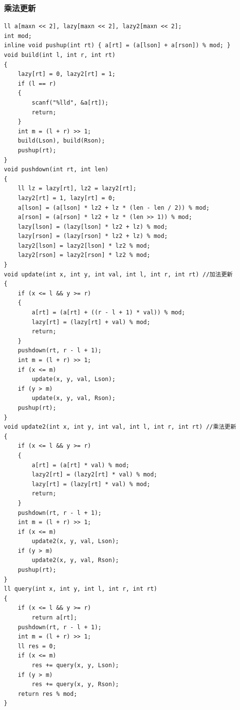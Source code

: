 \documentclass[twoside]{article}
\begin{document}
\subsubsection{乘法更新}
\begin{lstlisting}
ll a[maxn << 2], lazy[maxn << 2], lazy2[maxn << 2];
int mod;
inline void pushup(int rt) { a[rt] = (a[lson] + a[rson]) % mod; }
void build(int l, int r, int rt)
{
    lazy[rt] = 0, lazy2[rt] = 1;
    if (l == r)
    {
        scanf("%lld", &a[rt]);
        return;
    }
    int m = (l + r) >> 1;
    build(Lson), build(Rson);
    pushup(rt);
}
void pushdown(int rt, int len)
{
    ll lz = lazy[rt], lz2 = lazy2[rt];
    lazy2[rt] = 1, lazy[rt] = 0;
    a[lson] = (a[lson] * lz2 + lz * (len - len / 2)) % mod;
    a[rson] = (a[rson] * lz2 + lz * (len >> 1)) % mod;
    lazy[lson] = (lazy[lson] * lz2 + lz) % mod;
    lazy[rson] = (lazy[rson] * lz2 + lz) % mod;
    lazy2[lson] = lazy2[lson] * lz2 % mod;
    lazy2[rson] = lazy2[rson] * lz2 % mod;
}
void update(int x, int y, int val, int l, int r, int rt) //加法更新
{
    if (x <= l && y >= r)
    {
        a[rt] = (a[rt] + ((r - l + 1) * val)) % mod;
        lazy[rt] = (lazy[rt] + val) % mod;
        return;
    }
    pushdown(rt, r - l + 1);
    int m = (l + r) >> 1;
    if (x <= m)
        update(x, y, val, Lson);
    if (y > m)
        update(x, y, val, Rson);
    pushup(rt);
}
void update2(int x, int y, int val, int l, int r, int rt) //乘法更新
{
    if (x <= l && y >= r)
    {
        a[rt] = (a[rt] * val) % mod;
        lazy2[rt] = (lazy2[rt] * val) % mod;
        lazy[rt] = (lazy[rt] * val) % mod;
        return;
    }
    pushdown(rt, r - l + 1);
    int m = (l + r) >> 1;
    if (x <= m)
        update2(x, y, val, Lson);
    if (y > m)
        update2(x, y, val, Rson);
    pushup(rt);
}
ll query(int x, int y, int l, int r, int rt)
{
    if (x <= l && y >= r)
        return a[rt];
    pushdown(rt, r - l + 1);
    int m = (l + r) >> 1;
    ll res = 0;
    if (x <= m)
        res += query(x, y, Lson);
    if (y > m)
        res += query(x, y, Rson);
    return res % mod;
}
\end{lstlisting}
\end{document}
